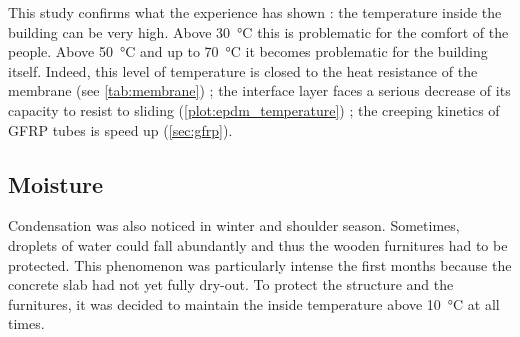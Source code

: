 This study confirms what the experience has shown : the temperature inside the building can be very high. Above \SI{30}{\celsius} this is problematic for the comfort of the people. Above \SI{50}{\celsius} and up to \SI{70}{\celsius} it becomes problematic for the building itself. Indeed, this level of temperature is closed to the heat resistance of the membrane (see \cref{tab:membrane}) ; the interface layer faces a serious decrease of its capacity to resist to sliding (\cref{plot:epdm_temperature}) ; the creeping kinetics of GFRP tubes is speed up (\cref{sec:gfrp}).

\subsection{Moisture}
Condensation was also noticed in winter and shoulder season. Sometimes, droplets of water could fall abundantly and thus the wooden furnitures had to be protected. This phenomenon was particularly intense the first months because the concrete slab had not yet fully dry-out. To protect the structure and the furnitures, it was decided to maintain the inside temperature above \SI{10}{\celsius} at all times.

